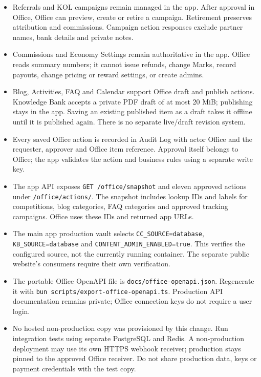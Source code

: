 \documentclass[11pt,a4paper]{article}
\newcommand{\code}[1]{\texttt{#1}}
\begin{document}
\begin{itemize}
  \item Referrals and KOL campaigns remain managed in the app. After approval in Office, Office can preview, create or retire a campaign. Retirement preserves attribution and commissions. Campaign action responses exclude partner names, bank details and private notes.
  \item Commissions and Economy Settings remain authoritative in the app. Office reads summary numbers; it cannot issue refunds, change Marks, record payouts, change pricing or reward settings, or create admins.
  \item Blog, Activities, FAQ and Calendar support Office draft and publish actions. Knowledge Bank accepts a private PDF draft of at most 20 MiB; publishing stays in the app. Saving an existing published item as a draft takes it offline until it is published again. There is no separate live/draft revision system.
  \item Every saved Office action is recorded in Audit Log with actor Office and the requester, approver and Office item reference. Approval itself belongs to Office; the app validates the action and business rules using a separate write key.
  \item The app API exposes \code{GET /office/snapshot} and eleven approved actions under \code{/office/actions/}. The snapshot includes lookup IDs and labels for competitions, blog categories, FAQ categories and approved tracking campaigns. Office uses these IDs and returned app URLs.
  \item The main app production vault selects \code{CC\_SOURCE=database}, \code{KB\_SOURCE=database} and \code{CONTENT\_ADMIN\_ENABLED=true}. This verifies the configured source, not the currently running container. The separate public website's consumers require their own verification.
  \item The portable Office OpenAPI file is \code{docs/office-openapi.json}. Regenerate it with \code{bun scripts/export-office-openapi.ts}. Production API documentation remains private; Office connection keys do not require a user login.
  \item No hosted non-production copy was provisioned by this change. Run integration tests using separate PostgreSQL and Redis. A non-production deployment may use its own HTTPS webhook receiver; production stays pinned to the approved Office receiver. Do not share production data, keys or payment credentials with the test copy.
\end{itemize}
\end{document}
